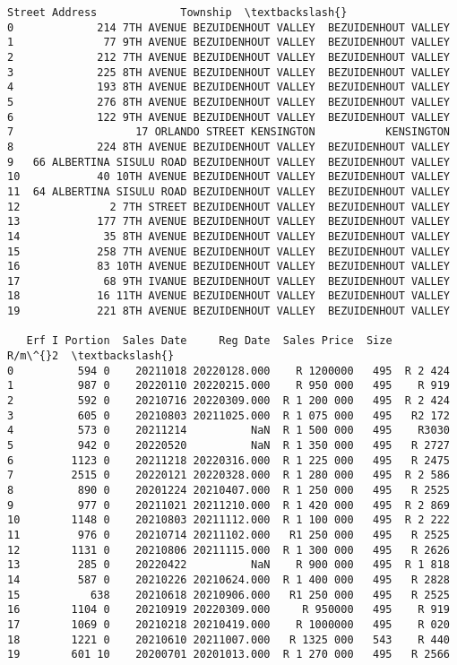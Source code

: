             \begin{tcolorbox}[breakable, size=fbox, boxrule=.5pt, pad at break*=1mm, opacityfill=0]
\begin{Verbatim}[commandchars=\\\{\}]
                                  Street Address             Township  \textbackslash{}
0             214 7TH AVENUE BEZUIDENHOUT VALLEY  BEZUIDENHOUT VALLEY
1              77 9TH AVENUE BEZUIDENHOUT VALLEY  BEZUIDENHOUT VALLEY
2             212 7TH AVENUE BEZUIDENHOUT VALLEY  BEZUIDENHOUT VALLEY
3             225 8TH AVENUE BEZUIDENHOUT VALLEY  BEZUIDENHOUT VALLEY
4             193 8TH AVENUE BEZUIDENHOUT VALLEY  BEZUIDENHOUT VALLEY
5             276 8TH AVENUE BEZUIDENHOUT VALLEY  BEZUIDENHOUT VALLEY
6             122 9TH AVENUE BEZUIDENHOUT VALLEY  BEZUIDENHOUT VALLEY
7                   17 ORLANDO STREET KENSINGTON           KENSINGTON
8             224 8TH AVENUE BEZUIDENHOUT VALLEY  BEZUIDENHOUT VALLEY
9   66 ALBERTINA SISULU ROAD BEZUIDENHOUT VALLEY  BEZUIDENHOUT VALLEY
10            40 10TH AVENUE BEZUIDENHOUT VALLEY  BEZUIDENHOUT VALLEY
11  64 ALBERTINA SISULU ROAD BEZUIDENHOUT VALLEY  BEZUIDENHOUT VALLEY
12              2 7TH STREET BEZUIDENHOUT VALLEY  BEZUIDENHOUT VALLEY
13            177 7TH AVENUE BEZUIDENHOUT VALLEY  BEZUIDENHOUT VALLEY
14             35 8TH AVENUE BEZUIDENHOUT VALLEY  BEZUIDENHOUT VALLEY
15            258 7TH AVENUE BEZUIDENHOUT VALLEY  BEZUIDENHOUT VALLEY
16            83 10TH AVENUE BEZUIDENHOUT VALLEY  BEZUIDENHOUT VALLEY
17             68 9TH IVANUE BEZUIDENHOUT VALLEY  BEZUIDENHOUT VALLEY
18            16 11TH AVENUE BEZUIDENHOUT VALLEY  BEZUIDENHOUT VALLEY
19            221 8TH AVENUE BEZUIDENHOUT VALLEY  BEZUIDENHOUT VALLEY

   Erf I Portion  Sales Date     Reg Date  Sales Price  Size    R/m\^{}2  \textbackslash{}
0          594 0    20211018 20220128.000    R 1200000   495  R 2 424
1          987 0    20220110 20220215.000    R 950 000   495    R 919
2          592 0    20210716 20220309.000  R 1 200 000   495  R 2 424
3          605 0    20210803 20211025.000  R 1 075 000   495   R2 172
4          573 0    20211214          NaN  R 1 500 000   495    R3030
5          942 0    20220520          NaN  R 1 350 000   495   R 2727
6         1123 0    20211218 20220316.000  R 1 225 000   495   R 2475
7         2515 0    20220121 20220328.000  R 1 280 000   495  R 2 586
8          890 0    20201224 20210407.000  R 1 250 000   495   R 2525
9          977 0    20211021 20211210.000  R 1 420 000   495  R 2 869
10        1148 0    20210803 20211112.000  R 1 100 000   495  R 2 222
11         976 0    20210714 20211102.000   R1 250 000   495   R 2525
12        1131 0    20210806 20211115.000  R 1 300 000   495   R 2626
13         285 0    20220422          NaN    R 900 000   495  R 1 818
14         587 0    20210226 20210624.000  R 1 400 000   495   R 2828
15           638    20210618 20210906.000   R1 250 000   495   R 2525
16        1104 0    20210919 20220309.000     R 950000   495    R 919
17        1069 0    20210218 20210419.000    R 1000000   495    R 020
18        1221 0    20210610 20211007.000   R 1325 000   543    R 440
19        601 10    20200701 20201013.000  R 1 270 000   495   R 2566


\end{Verbatim}
\end{tcolorbox}
